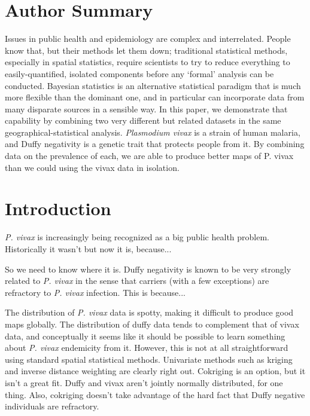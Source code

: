 \documentclass[10pt]{article}
\begin{document}
\section*{Author Summary}

Issues in public health and epidemiology are complex and interrelated. People know that, but their methods let them down; traditional statistical methods, especially in spatial statistics, require scientists to try to reduce everything to easily-quantified, isolated components before any `formal' analysis can be conducted. Bayesian statistics is an alternative statistical paradigm that is much more flexible than the dominant one, and in particular can incorporate data from many disparate sources in a sensible way. In this paper, we demonstrate that capability by combining two very different but related datasets in the same geographical-statistical analysis. \emph{Plasmodium vivax} is a strain of human malaria, and Duffy negativity is a genetic trait that protects people from it. By combining data on the prevalence of each, we are able to produce better maps of P. vivax than we could using the vivax data in isolation.

\section*{Introduction}

\emph{P. vivax} is increasingly being recognized as a big public health problem. Historically it wasn't but now it is, because...

So we need to know where it is. Duffy negativity is known to be very strongly related to \emph{P. vivax} in the sense that carriers (with a few exceptions) are refractory to \emph{P. vivax} infection. This is because...

The distribution of \emph{P. vivax} data is spotty, making it difficult to produce good maps globally. The distribution of duffy data tends to complement that of vivax data, and conceptually it seems like it should be possible to learn something about \emph{P. vivax} endemicity from it. However, this is not at all straightforward using standard spatial statistical methods. Univariate methods such as kriging and inverse distance weighting are clearly right out. Cokriging is an option, but it isn't a great fit. Duffy and vivax aren't jointly normally distributed, for one thing. Also, cokriging doesn't take advantage of the hard fact that Duffy negative individuals are refractory.
\end{document}
